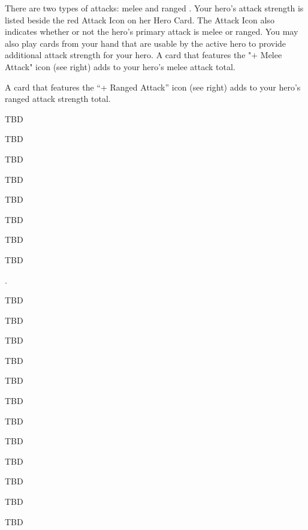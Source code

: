 There are two types of attacks: melee and ranged . Your hero’s attack
strength is listed beside the red Attack Icon on her Hero Card. The Attack Icon
also indicates whether or not the hero’s primary attack is melee or ranged.
You may also play cards from your hand that are usable by the active hero to
provide additional attack strength for your hero. A card that features the
"+ Melee Attack" icon (see right) adds to your hero’s melee attack total.

A card that features the “+ Ranged Attack” icon (see right) adds to your hero’s
ranged attack strength total.

TBD


TBD

TBD

TBD

TBD

TBD

TBD

TBD

.

TBD

TBD

TBD

TBD

TBD

TBD

TBD

TBD

TBD

TBD

TBD

TBD

